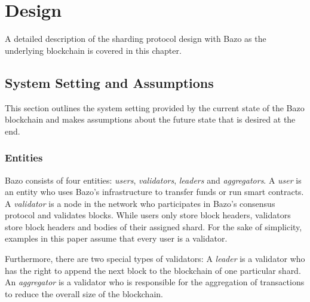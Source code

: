 
\chapter{Design}

\label{Chapter:Design}

A detailed description of the sharding protocol design with Bazo as the underlying blockchain is covered in this chapter.

\section{System Setting and Assumptions}

This section outlines the system setting provided by the current state of the Bazo blockchain and makes assumptions about the future state that is desired at the end.

\subsection{Entities}

Bazo consists of four entities: \textit{users}, \textit{validators}, \textit{leaders} and \textit{aggregators}. A \textit{user} is an entity who uses Bazo's infrastructure to transfer funds or run smart contracts. A \textit{validator} is a node in the network who participates in Bazo's consensus protocol and validates blocks. While users only store block headers, validators store block headers and bodies of their assigned shard. For the sake of simplicity, examples in this paper assume that every user is a validator.

Furthermore, there are two special types of validators: A \textit{leader} is a validator who has the right to append the next block to the blockchain of one particular shard. An \textit{aggregator} is a validator who is responsible for the aggregation of transactions to reduce the overall size of the blockchain. 

